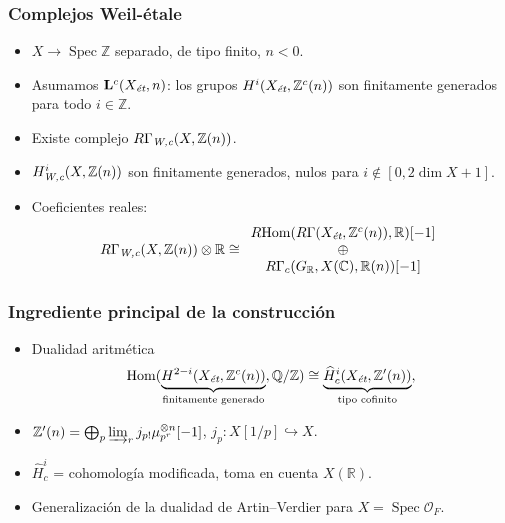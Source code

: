 \documentclass[handout]{beamer}
\newcommand{\CC}{\mathbb{C}}
\newcommand{\FF}{\mathbb{F}}
\newcommand{\QQ}{\mathbb{Q}}
\newcommand{\RR}{\mathbb{R}}
\newcommand{\ZZ}{\mathbb{Z}}
\DeclareMathOperator{\Hom}{Hom}
\DeclareMathOperator{\Spec}{Spec}
\newcommand{\et}{\text{\it ét}}
\newcommand{\Wc}{\text{\it W,c}}
\newcommand{\RHom}{R\!\Hom}
\begin{document}
\begin{frame}
  \frametitle{Complejos Weil-étale}

  \begin{itemize}
  \item $X \to \Spec \ZZ$ separado, de tipo finito, $n < 0$.

  \item Asumamos $\mathbf{L}^c (X_\et, n)$: los grupos $H^i (X_\et, \ZZ^c(n))$
    son finitamente generados para todo $i \in \ZZ$.

  \item Existe complejo $R\Gamma_\Wc (X, \ZZ(n))$.

  \item $H^i_\Wc (X, \ZZ(n))$ son finitamente generados, nulos para
    $i \notin [0, 2\dim X + 1]$.


  \item Coeficientes reales:
    \[ R\Gamma_\Wc (X, \ZZ(n)) \otimes \RR \cong
      \begin{array}{c}
        \RHom(R\Gamma(X_\et, \ZZ^c(n)), \RR)[-1]\\
        \oplus \\
        R\Gamma_c (G_\RR, X(\CC), \RR(n))[-1]
      \end{array} \]
  \end{itemize}
\end{frame}


\begin{frame}
  \frametitle{Ingrediente principal de la construcción}

  \begin{itemize}
  \item Dualidad aritmética
    \[ \Hom (\underbrace{H^{2-i} (X_\et, \ZZ^c (n))}_{\text{finitamente generado}}, \QQ/\ZZ) \cong
      \underbrace{\widehat{H}^i_c (X_\et, \ZZ' (n))}_{\text{tipo cofinito}}, \]

  \item $\ZZ' (n) = \bigoplus_p \varinjlim_r j_{p!} \mu_{p^r}^{\otimes n} [-1]$,
    \quad $j_p\colon X[1/p] \hookrightarrow X$.

  \item $\widehat{H}^i_c$ = cohomología modificada, toma en cuenta $X (\RR)$.

  \item Generalización de la dualidad de Artin--Verdier para
    $X = \Spec \mathcal{O}_F$.
  \end{itemize}
\end{frame}
\end{document}
